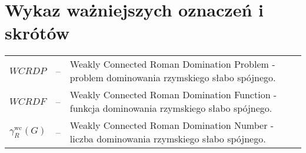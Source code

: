 \chapter*{Wykaz ważniejszych oznaczeń i skrótów}

\begin{tabular}{@{} l l p{} @{}}
    $WCRDP$ & -- & Weakly Connected Roman Domination Problem - problem dominowania rzymskiego słabo spójnego.\\
    $WCRDF$ & -- & Weakly Connected Roman Domination Function - funkcja dominowania rzymskiego słabo spójnego. \\
    $\gamma_{R}^{\text{wc}}(G)$ & -- & Weakly Connected Roman Domination Number - liczba dominowania rzymskiego słabo spójnego. \\
\end{tabular}
